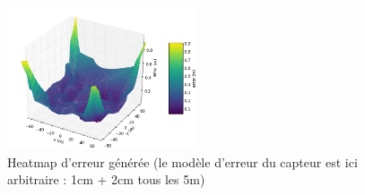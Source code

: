 \documentclass[twoside,twocolumn]{article}
\begin{document}
\begin{figure}
 \centering
 \includegraphics[width=0.5\textwidth]{heatmap}
 \caption{Heatmap d'erreur générée (le modèle d'erreur du capteur est ici arbitraire : 1cm + 2cm tous les 5m)}
 \label{fig:heatmap3D}
\end{figure}


\printbibliography
\end{document}
